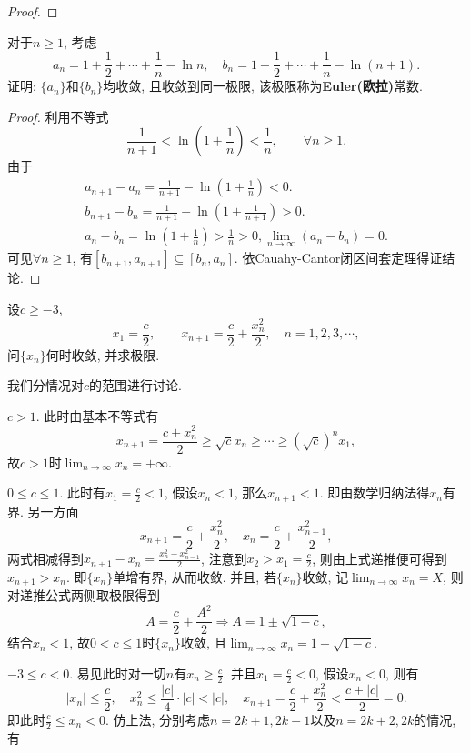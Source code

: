 \begin{quiza}
\begin{proof}
\end{proof}
\woe 对于\(n\geqslant 1\), 考虑\[a_n=1+\frac{1}{2}+\cdots+\frac{1}{n}-\ln n,\quad b_n=1+\frac{1}{2}+\cdots+\frac{1}{n}-\ln(n+1).\]
证明: \(\{a_n\}\)和\(\{b_n\}\)均收敛, 且收敛到同一极限, 该极限称为\textbf{Euler(欧拉)}常数.
\begin{proof}
利用不等式\[\frac{1}{n+1}<\ln\left(1+\frac{1}{n}\right)<\frac{1}{n},\qquad\forall n\geqslant 1.\]由于
    \begin{gather*}
      a_{n+1}-a_{n}=\frac{1}{n+1}-\ln\left(1+\frac{1}{n}\right)<0.\\
      b_{n+1}-b_{n}=\frac{1}{n+1}-\ln\left(1+\frac{1}{n+1}\right)>0.\\
      a_n-b_n=\ln\left(1+\frac{1}{n}\right)>\frac{1}{n}>0, \lim_{n\rightarrow\infty}(a_n-b_n)=0.
    \end{gather*}
可见\(\forall n\geqslant 1\), 有\([b_{n+1},a_{n+1}]\subseteq [b_n,a_n]\). 依Cauahy-Cantor闭区间套定理得证结论.
\end{proof}
\woe 设\(c\geqslant -3\), \[x_1=\frac{c}{2},\qquad x_{n+1}=\frac{c}{2}+\frac{x_n^2}{2},\quad n=1,2,3,\cdots,\]问\(\{x_n\}\)何时收敛, 并求极限.
\begin{solution}
我们分情况对\(c\)的范围进行讨论.
\begin{asparaenum}[\bfseries (i)]
\item \(c> 1\). 此时由基本不等式有\[x_{n+1}=\frac{c+x_n^2}{2}\geqslant\sqrt{c}x_n\geqslant\cdots\geqslant \left(\sqrt{c}\right)^nx_1,\]
故\(c>1\)时\(\lim_{n\rightarrow\infty}x_n=+\infty\).
\item \(0\leqslant c\leqslant 1\). 此时有\(x_1=\frac{c}{2}<1\), 假设\(x_n<1\), 那么\(x_{n+1}<1\). 即由数学归纳法得\(x_n\)有界. 另一方面\[x_{n+1}=\frac{c}{2}+\frac{x_n^2}{2},\quad x_n=\frac{c}{2}+\frac{x_{n-1}^2}{2},\]两式相减得到\(x_{n+1}-x_{n}=\frac{x_n^2-x_{n-1}^2}{2}\), 注意到\(x_2>x_1=\frac{c}{2}\), 则由上式递推便可得到\(x_{n+1}>x_n\). 即\(\{x_n\}\)单增有界, 从而收敛. 并且, 若\(\{x_n\}\)收敛, 记\(\lim_{n\rightarrow\infty}x_n=X\), 则对递推公式两侧取极限得到\[A=\frac{c}{2}+\frac{A^2}{2}\Rightarrow A=1\pm\sqrt{1-c},\]结合\(x_n<1\), 故\(0<c\leqslant 1\)时\(\{x_n\}\)收敛, 且\(\lim_{n\rightarrow\infty}x_n=1-\sqrt{1-c}.\)
\item \label{c2x2f}\(-3\leqslant c< 0\). 易见此时对一切\(n\)有\(x_n\geqslant\frac{c}{2}\). 并且\(x_1=\frac{c}{2}<0\), 假设\(x_n<0\), 则有\[\left|x_n\right|\leqslant\frac{c}{2},\quad x_n^2\leqslant\frac{\left|c\right|}{4}\cdot|c|<|c|,\quad x_{n+1}=\frac{c}{2}+\frac{x_n^2}{2}<\frac{c+|c|}{2}=0.\]即此时\(\frac{c}{2}\leqslant x_n<0\). 仿上法, 分别考虑\(n=2k+1,2k-1\)以及\(n=2k+2,2k\)的情况, 有\begin{align}

\end{align}
\end{asparaenum}
\end{solution}
\end{quiza}
